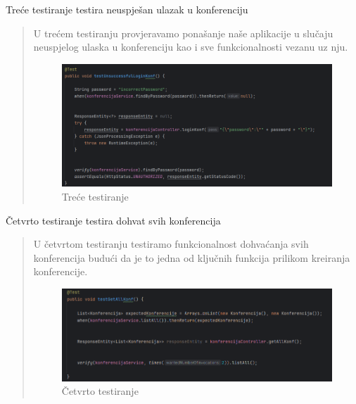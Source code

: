 \begin{packed_enum}
				\item Treće testiranje testira neuspješan ulazak u konferenciju
				\begin{quote}
					U trećem testiranju provjeravamo ponašanje naše aplikacije u slučaju neuspjelog ulaska u konferenciju kao i sve funkcionalnosti vezanu uz nju.
					\begin{figure}[H]
						\includegraphics[width=\textwidth]{slike/JUnit3.png} %
						\caption{Treće testiranje}
						\label{fig:JUnit3} %
					\end{figure}
				\end{quote}
				
				\item Četvrto testiranje testira dohvat svih konferencija 
				\begin{quote}
					U četvrtom testiranju testiramo funkcionalnost dohvaćanja svih konferencija budući da je to jedna od ključnih funkcija prilikom kreiranja konferencije.
					\begin{figure}[H]
						\includegraphics[width=\textwidth]{slike/JUnit4.png} %
						\caption{Četvrto testiranje}
						\label{fig:JUnit4} %
					\end{figure}
				\end{quote}
				

\end{packed_enum}

